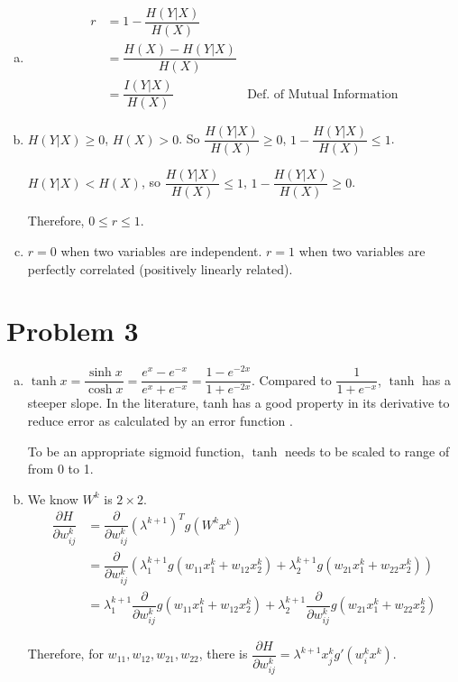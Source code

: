 \documentclass[10pt]{article}
\begin{document}
\begin{enumerate}[(a)]

\item 
\begin{align}
r &= 1 - \dfrac{H(Y|X)}{H(X)}\\
&= \dfrac{H(X) - H(Y|X)}{H(X)}\\
&= \dfrac{I(Y|X)}{H(X)} &\text{Def.\ of Mutual Information}
\end{align}

\item $H(Y|X) \geq 0$, $H(X) > 0$. So $\dfrac{H(Y|X)}{H(X)} \geq 0$,
$1 - \dfrac{H(Y|X)}{H(X)} \leq 1$.

$H(Y|X) < H(X)$, so $\dfrac{H(Y|X)}{H(X)} \leq 1$, $1 -
\dfrac{H(Y|X)}{H(X)} \geq 0$.

Therefore, $0 \leq r \leq 1$.

\item $r = 0$ when two variables are independent. $r = 1$ when two
variables are perfectly correlated (positively linearly related).

\end{enumerate}

\section*{Problem 3}
\begin{enumerate}[(a)]

\item  $\tanh x = \dfrac{\sinh x}{\cosh x} = \dfrac{e^x - e^{-x}}{e^x
+ e^{-x}} = \dfrac{1 - e^{-2x}}{1 + e^{-2x}}$. Compared to $\dfrac{1}{1
+ e^{-x}}$, $\tanh$ has a steeper slope. In the literature, tanh has a
good property in its derivative to reduce error as calculated by an
error function \cite{sigmoid}.

To be an appropriate sigmoid function, $\tanh$ needs to be scaled to
range of from 0 to 1.

\item We know $W^k$ is $2 \times 2$.
\begin{align}
\dfrac{\partial H}{\partial w_{ij}^k} &= \dfrac{\partial}{\partial
w_{ij}^k} (\lambda^{k+1})^T g(W^kx^k)\\
&= \dfrac{\partial}{\partial w_{ij}^k} (\lambda_1^{k+1} g(w_{11}x_1^k
+ w_{12}x_2^k) + \lambda_2^{k+1} g(w_{21}x_1^k + w_{22}x_2^k))\\
&= \lambda_1^{k+1} \dfrac{\partial}{\partial w_{ij}^k} g(w_{11}x_1^k
+ w_{12}x_2^k) + \lambda_2^{k+1} \dfrac{\partial}{\partial w_{ij}^k}
g(w_{21}x_1^k + w_{22}x_2^k)
\end{align}

Therefore, for $w_{11}, w_{12}, w_{21}, w_{22}$, there is
$\dfrac{\partial H}{\partial w_{ij}^k} = \lambda^{k+1} x_j^k g'(w_i^k x^k)$.

\end{enumerate}
\end{document}
